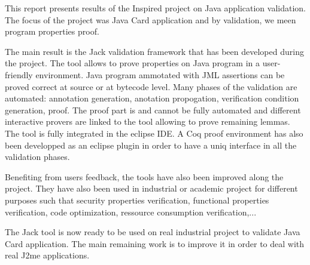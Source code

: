 \documentclass[a4paper, 11pt]{article}
\begin{document}
This report presents results of the Inspired project on Java application validation. The focus of the project was Java Card application and by validation, we meen program properties proof.

The main result is the Jack validation framework that has been developed during the project. The tool allows to prove properties on Java program in a user-friendly environment. Java program ammotated with JML assertions can be proved correct at source or at bytecode level. Many phases of the validation are automated: annotation generation, anotation propogation, verification condition generation, proof. The proof part is and cannot be fully automated and different interactive provers are linked to the tool allowing to prove remaining lemmas. The tool is fully integrated in the eclipse IDE. A Coq proof environment has also been developped as an eclipse plugin in order to have a uniq interface in all the validation phases.

Benefiting from users feedback, the tools have also been improved along the project. They have also been used in industrial or academic project for different purposes such that security properties verification, functional properties verification, code optimization, ressource consumption verification,...

The Jack tool is now ready to be used on real industrial project to validate Java Card application. The main remaining work is to improve it in order to deal with real J2me applications. 
\end{document}
